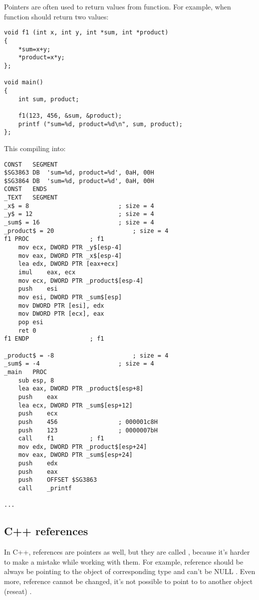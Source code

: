 \section{}
\index{\CLanguageElements!\Pointers}
\label{label_pointers}

{Pointers are often used to return values from function.}
{For example, when function should return two values:}

\begin{lstlisting}
void f1 (int x, int y, int *sum, int *product)
{
	*sum=x+y;
	*product=x*y;
};

void main()
{
	int sum, product;

	f1(123, 456, &sum, &product);
	printf ("sum=%d, product=%d\n", sum, product);
};
\end{lstlisting}

{This compiling into:}

\begin{lstlisting}[caption=\Optimizing MSVC 2010]
CONST	SEGMENT
$SG3863	DB	'sum=%d, product=%d', 0aH, 00H
$SG3864	DB	'sum=%d, product=%d', 0aH, 00H
CONST	ENDS
_TEXT	SEGMENT
_x$ = 8							; size = 4
_y$ = 12						; size = 4
_sum$ = 16						; size = 4
_product$ = 20						; size = 4
f1 PROC					; f1
	mov	ecx, DWORD PTR _y$[esp-4]
	mov	eax, DWORD PTR _x$[esp-4]
	lea	edx, DWORD PTR [eax+ecx]
	imul	eax, ecx
	mov	ecx, DWORD PTR _product$[esp-4]
	push	esi
	mov	esi, DWORD PTR _sum$[esp]
	mov	DWORD PTR [esi], edx
	mov	DWORD PTR [ecx], eax
	pop	esi
	ret	0
f1 ENDP					; f1

_product$ = -8						; size = 4
_sum$ = -4						; size = 4
_main	PROC
	sub	esp, 8
	lea	eax, DWORD PTR _product$[esp+8]
	push	eax
	lea	ecx, DWORD PTR _sum$[esp+12]
	push	ecx
	push	456					; 000001c8H
	push	123					; 0000007bH
	call	f1			; f1
	mov	edx, DWORD PTR _product$[esp+24]
	mov	eax, DWORD PTR _sum$[esp+24]
	push	edx
	push	eax
	push	OFFSET $SG3863
	call	_printf

...
\end{lstlisting}

\subsection{C++ references}

{In C++, references are pointers as well, but they are called , because it's harder to make a mistake while
working with them}\cite[8.3.2]{CPP11}.
{For example, reference should be always be pointing to the object of corresponding type and can't be NULL}
\cite[8.6]{ParashiftCPPFAQ}.
{Even more, reference cannot be changed, it's not possible to point to to another object (reseat)}
\cite[8.5]{ParashiftCPPFAQ}.

